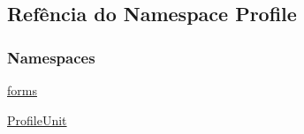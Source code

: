 \hypertarget{namespaceProfile}{}\subsection{Refência do Namespace Profile}
\label{namespaceProfile}
\subsubsection*{Namespaces}
\begin{DoxyCompactItemize}
\item 
 \hyperlink{namespaceProfile_1_1forms}{forms}
\item 
 \hyperlink{namespaceProfile_1_1ProfileUnit}{Profile\+Unit}
\end{DoxyCompactItemize}
